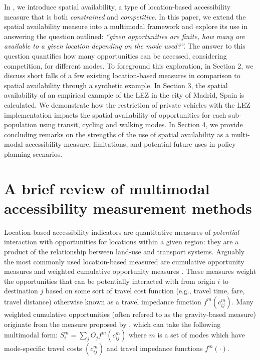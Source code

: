 \documentclass[]{trbunofficial}
\begin{document}
In \citet{soukhovIntroducingSpatialAvailability2023}, we introduce
spatial availability, a type of location-based accessibility measure
that is both \emph{constrained} and \emph{competitive}. In this paper,
we extend the spatial availability measure into a multimodal framework
and explore its use in answering the question outlined: \emph{``given
opportunities are finite, how many are available to a given location
depending on the mode used?''.} The answer to this question quantifies
how many opportunities can be accessed, considering competition, for
different modes. To foreground this exploration, in Section 2, we
discuss short falls of a few existing location-based measures in
comparison to spatial availability through a synthetic example. In
Section 3, the spatial availability of an empirical example of the LEZ
in the city of Madrid, Spain is calculated. We demonstrate how the
restriction of private vehicles with the LEZ implementation impacts the
spatial availability of opportunities for each sub-population using
transit, cycling and walking modes. In Section 4, we provide concluding
remarks on the strengths of the use of spatial availability as a
multi-modal accessibility measure, limitations, and potential future
uses in policy planning scenarios.

\hypertarget{a-brief-review-of-multimodal-accessibility-measurement-methods}{%
\section{A brief review of multimodal accessibility measurement
methods}\label{a-brief-review-of-multimodal-accessibility-measurement-methods}}

Location-based accessibility indicators are quantitative measures of
\emph{potential} interaction with opportunities for locations within a
given region: they are a product of the relationship between land-use
and transport systems. Arguably the most commonly used location-based
measured are cumulative opportunity measures and weighted cumulative
opportunity measures \citep{levinsonTransportAccessManual2020}. These
measures weight the opportunities that can be potentially interacted
with from origin \(i\) to destination \(j\) based on some sort of travel
cost function (e.g., travel time, fare, travel distance) otherwise known
as a travel impedance function \(f^{m}(c^m_{ij})\). Many weighted
cumulative opportunities (often refered to as the gravity-based measure)
originate from the measure proposed by
\citet{hansenHowAccessibilityShapes1959}, which can take the following
multimodal form: \(S_i^m = \sum_j O_j f^m(c_{ij}^m)\) where \(m\) is a
set of modes which have mode-specific travel costs \((c_{ij}^m)\) and
travel impedance functions \(f^m(\cdot)\).
\end{document}
